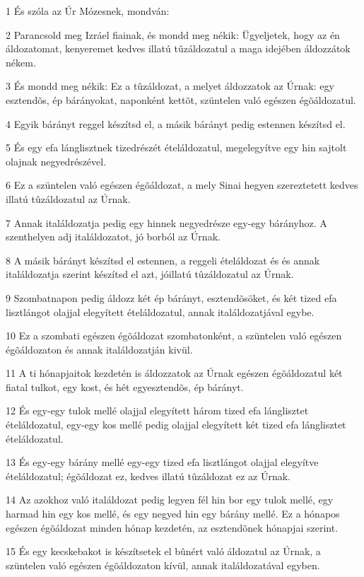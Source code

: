 \par 1 És szóla az Úr Mózesnek, mondván:
\par 2 Parancsold meg Izráel fiainak, és mondd meg nékik: Ügyeljetek, hogy az én áldozatomat, kenyeremet kedves illatú tûzáldozatul a maga idejében áldozzátok nékem.
\par 3 És mondd meg nékik: Ez a tûzáldozat, a melyet áldozzatok az Úrnak: egy esztendõs, ép bárányokat, naponként kettõt, szüntelen való egészen égõáldozatul.
\par 4 Egyik bárányt reggel készítsd el, a másik bárányt pedig estennen készítsd el.
\par 5 És egy efa lánglisztnek tizedrészét ételáldozatul, megelegyítve egy hin sajtolt olajnak negyedrészével.
\par 6 Ez a szüntelen való egészen égõáldozat, a mely Sinai hegyen szereztetett kedves illatú tûzáldozatul az Úrnak.
\par 7 Annak italáldozatja pedig egy hinnek negyedrésze egy-egy bárányhoz. A szenthelyen adj italáldozatot, jó borból az Úrnak.
\par 8 A másik bárányt készítsd el estennen, a reggeli ételáldozat és és annak italáldozatja szerint készítsd el azt, jóillatú tûzáldozatul az Úrnak.
\par 9 Szombatnapon pedig áldozz két ép bárányt, esztendõsöket, és két tized efa lisztlángot olajjal elegyített ételáldozatul, annak italáldozatjával egybe.
\par 10 Ez a szombati egészen égõáldozat szombatonként, a szüntelen való egészen égõáldozaton és annak italáldozatján kivül.
\par 11 A ti hónapjaitok kezdetén is áldozzatok az Úrnak egészen égõáldozatul két fiatal tulkot, egy kost, és hét egyesztendõs, ép bárányt.
\par 12 És egy-egy tulok mellé olajjal elegyített három tized efa lánglisztet ételáldozatul, egy-egy kos mellé pedig olajjal elegyített két tized efa lánglisztet ételáldozatul.
\par 13 És egy-egy bárány mellé egy-egy tized efa lisztlángot olajjal elegyítve ételáldozatul; égõáldozat ez, kedves illatú tûzáldozat ez az Úrnak.
\par 14 Az azokhoz való italáldozat pedig legyen fél hin bor egy tulok mellé, egy harmad hin egy kos mellé, és egy negyed hin egy bárány mellé. Ez a hónapos egészen égõáldozat minden hónap kezdetén, az esztendõnek hónapjai szerint.
\par 15 És egy kecskebakot is készítsetek el bûnért való áldozatul az Úrnak, a szüntelen való egészen égõáldozaton kívül, annak italáldozatával egyben.
